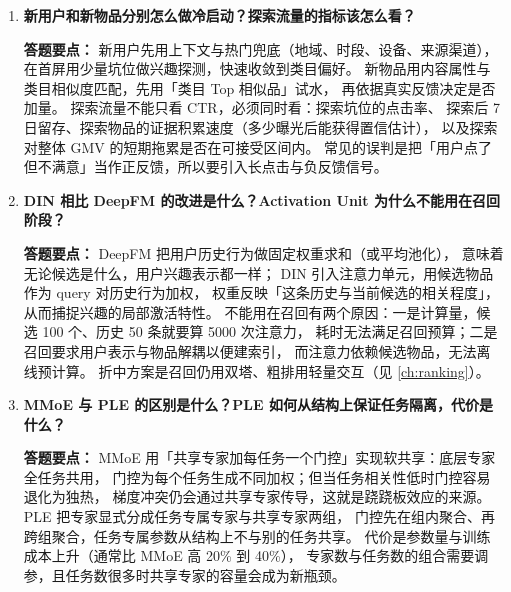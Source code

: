 \begin{interview}[题库与答题要点]

\begin{enumerate}[label=]

  \item[\textcolor{VioletDeep}{\textbf{Q14.}}] \textbf{新用户和新物品分别怎么做冷启动？探索流量的指标该怎么看？}
\par\smallskip\noindent\textcolor{VioletDeep}{\textbf{答题要点：}}
新用户先用上下文与热门兜底（地域、时段、设备、来源渠道），
在首屏用少量坑位做兴趣探测，快速收敛到类目偏好。
新物品用内容属性与类目相似度匹配，先用「类目 Top 相似品」试水，
再依据真实反馈决定是否加量。
探索流量不能只看 CTR，必须同时看：探索坑位的点击率、
探索后 7 日留存、探索物品的证据积累速度（多少曝光后能获得置信估计），
以及探索对整体 GMV 的短期拖累是否在可接受区间内。
常见的误判是把「用户点了但不满意」当作正反馈，所以要引入长点击与负反馈信号。

  \item[\textcolor{VioletDeep}{\textbf{Q15.}}] \textbf{DIN 相比 DeepFM 的改进是什么？Activation Unit 为什么不能用在召回阶段？}
\par\smallskip\noindent\textcolor{VioletDeep}{\textbf{答题要点：}}
DeepFM 把用户历史行为做固定权重求和（或平均池化），
意味着无论候选是什么，用户兴趣表示都一样；
DIN 引入注意力单元，用候选物品作为 query 对历史行为加权，
权重反映「这条历史与当前候选的相关程度」，从而捕捉兴趣的局部激活特性。
不能用在召回有两个原因：一是计算量，候选 100 个、历史 50 条就要算 5000 次注意力，
耗时无法满足召回预算；二是召回要求用户表示与物品解耦以便建索引，
而注意力依赖候选物品，无法离线预计算。
折中方案是召回仍用双塔、粗排用轻量交互（见 \cref{ch:ranking}）。

  \item[\textcolor{VioletDeep}{\textbf{Q16.}}] \textbf{MMoE 与 PLE 的区别是什么？PLE 如何从结构上保证任务隔离，代价是什么？}
\par\smallskip\noindent\textcolor{VioletDeep}{\textbf{答题要点：}}
MMoE 用「共享专家加每任务一个门控」实现软共享：底层专家全任务共用，
门控为每个任务生成不同加权；但当任务相关性低时门控容易退化为独热，
梯度冲突仍会通过共享专家传导，这就是跷跷板效应的来源。
PLE 把专家显式分成任务专属专家与共享专家两组，
门控先在组内聚合、再跨组聚合，任务专属参数从结构上不与别的任务共享。
代价是参数量与训练成本上升（通常比 MMoE 高 20\% 到 40\%），
专家数与任务数的组合需要调参，且任务数很多时共享专家的容量会成为新瓶颈。


\end{enumerate}
\end{interview}
